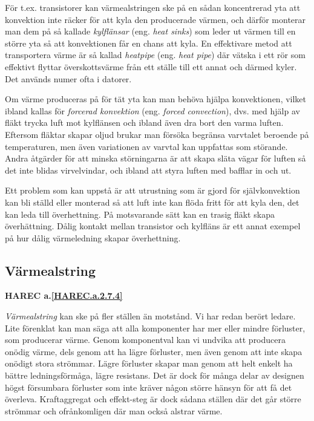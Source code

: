 För t.ex. transistorer kan värmealstringen ske på en sådan koncentrerad yta att
konvektion inte räcker för att kyla den producerade värmen, och därför monterar
man dem på så kallade \emph{kylflänsar} (eng. \emph{heat sinks}) som leder ut
värmen till en större yta så att konvektionen får en chans att kyla.
En effektivare metod att transportera värme är så kallad \emph{heatpipe} (eng.
\emph{heat pipe}) där vätska i ett rör som effektivt flyttar överskottsvärme
från ett ställe till ett annat och därmed kyler. Det används numer ofta i
datorer.

Om värme produceras på för tät yta kan man behöva hjälpa konvektionen, vilket
ibland kallas för \emph{forcerad konvektion} (eng. \emph{forced convection}),
dvs. med hjälp av fläkt trycka luft mot kylflänsen och ibland även dra bort
den varma luften. Eftersom fläktar skapar oljud brukar man försöka begränsa
varvtalet beroende på temperaturen, men även variationen av varvtal kan
uppfattas som störande. Andra åtgärder för att minska störningarna är att
skapa släta vägar för luften så det inte blidas virvelvindar, och ibland att
styra luften med bafflar in och ut.

Ett problem som kan uppstå är att utrustning som är gjord för självkonvektion
kan bli ställd eller monterad så att luft inte kan flöda fritt för att kyla
den, det kan leda till överhettning. På motsvarande sätt kan en trasig fläkt
skapa överhättning. Dålig kontakt mellan transistor och kylfläns är ett annat
exempel på hur dålig värmeledning skapar överhettning.

\subsection{Värmealstring}
\textbf{
HAREC a.\ref{HAREC.a.2.7.4}\label{myHAREC.a.2.7.4}
}

\emph{Värmealstring} kan ske på fler ställen än motstånd. Vi har redan berört
ledare. Lite förenklat kan man säga att alla komponenter har mer eller mindre
förluster, som producerar värme. Genom komponentval kan vi undvika att
producera onödig värme, dels genom att ha lägre förluster, men även genom att
inte skapa onödigt stora strömmar. Lägre förluster skapar man genom att helt
enkelt ha bättre ledningsförmåga, lägre resistans. Det är dock för många
delar av designen högst försumbara förluster som inte kräver någon större
hänsyn för att få det överleva. Kraftaggregat och effekt-steg är dock sådana
ställen där det går större strömmar och ofrånkomligen där man också alstrar
värme.

